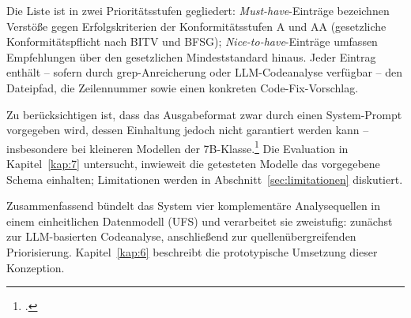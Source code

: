 Die Liste ist in zwei Prioritätsstufen gegliedert: \emph{Must-have}-Einträge bezeichnen Verstöße gegen Erfolgskriterien der Konformitätsstufen A und AA (gesetzliche Konformitätspflicht nach \ac{BITV} und \ac{BFSG}); \emph{Nice-to-have}-Einträge umfassen Empfehlungen über den gesetzlichen Mindeststandard hinaus. Jeder Eintrag enthält -- sofern durch grep-Anreicherung oder \ac{LLM}-Codeanalyse verfügbar -- den Dateipfad, die Zeilennummer sowie einen konkreten Code-Fix-Vorschlag.

Zu berücksichtigen ist, dass das Ausgabeformat zwar durch einen System-Prompt vorgegeben wird, dessen Einhaltung jedoch nicht garantiert werden kann -- insbesondere bei kleineren Modellen der 7B-Klasse.\footcite[Vgl.][S.~5]{brown2020gpt3fewshot} Die Evaluation in Kapitel~\ref{kap:7} untersucht, inwieweit die getesteten Modelle das vorgegebene Schema einhalten; Limitationen werden in Abschnitt~\ref{sec:limitationen} diskutiert. 
\enlargethispage{2\baselineskip}

Zusammenfassend bündelt das System vier komplementäre Analysequellen in einem einheitlichen Datenmodell (\ac{UFS}) und verarbeitet sie zweistufig: zunächst zur \ac{LLM}-basierten \mbox{Codeanalyse}, anschließend zur quellenübergreifenden Priorisierung. Kapitel~\ref{kap:6} beschreibt die prototypische Umsetzung dieser Konzeption.
